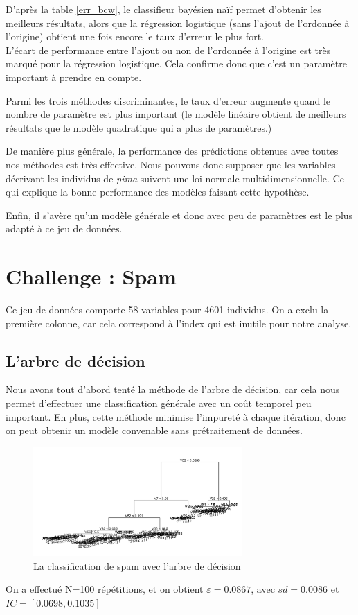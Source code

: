\documentclass{article}
\begin{document}
D'après la table \ref{err_bcw}, le classifieur bayésien naïf permet d'obtenir les meilleurs résultats, alors que la régression logistique (sans l'ajout de l'ordonnée à l'origine) obtient une fois encore le taux d'erreur le plus fort.\\

L'écart de performance entre l'ajout ou non de l'ordonnée à l'origine est très marqué pour la régression logistique. Cela confirme donc que c'est un paramètre important à prendre en compte.

Parmi les trois méthodes discriminantes, le taux d'erreur augmente quand le nombre de paramètre est plus important (le modèle linéaire obtient de meilleurs résultats que le modèle quadratique qui a plus de paramètres.)

De manière plus générale, la performance des prédictions obtenues avec toutes nos méthodes est très effective. Nous pouvons donc supposer que les variables décrivant les individus de \textit{pima} suivent une loi normale multidimensionnelle. Ce qui explique la bonne performance des modèles faisant cette hypothèse. 

Enfin, il s'avère qu'un modèle générale et donc avec peu de paramètres est le plus adapté à ce jeu de données.











\section{Challenge : Spam}

Ce jeu de données comporte 58 variables pour 4601 individus. 
On a exclu la première colonne, car cela correspond à l'index qui est inutile pour notre analyse.

\subsection{L'arbre de décision}
Nous avons tout d'abord tenté la méthode de l'arbre de décision, car cela nous permet d'effectuer une classification générale avec un coût temporel peu important. En plus, cette méthode minimise l'impureté à chaque itération, donc on peut obtenir un modèle convenable sans prétraitement de données.

\begin{figure}[H]
\centering
\includegraphics[width=8cm]{img/arbre_spam.png}
\caption{La classification de spam avec l'arbre de décision}
\label{arbre_spam}
\end{figure}
On a effectué N=100 répétitions, et on obtient $ \overline{\varepsilon}=0.0867$, avec $sd=0.0086$ et $IC=\left[0.0698,0.1035\right]$
\end{document}
